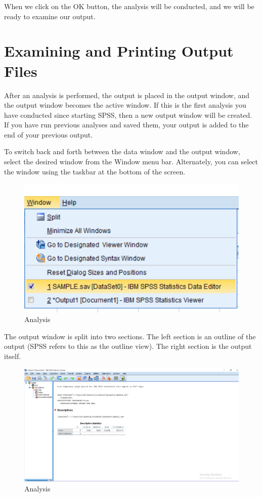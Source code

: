 \documentclass[
]{book}
\begin{document}
When we click on the OK button, the analysis will be conducted, and we will be ready to examine our output.

\hypertarget{examining-and-printing-output-files}{%
\section{Examining and Printing Output Files}\label{examining-and-printing-output-files}}

After an analysis is performed, the output is placed in the output window, and the output window becomes the active window. If this is the first analysis you have conducted since starting SPSS, then a new output window will be created. If you have run previous analyses and saved them, your output is added to the end of your previous output.

To switch back and forth between the data window and the output window, select the desired window from the Window menu bar. Alternately, you can select the window using the taskbar at the bottom of the screen.

\begin{figure}
\centering
\includegraphics{WindowsChange.png}
\caption{Analysis}
\end{figure}

The output window is split into two sections. The left section is an outline of the output (SPSS refers to this as the outline view). The right section is the output itself.

\begin{figure}
\centering
\includegraphics{output2.png}
\caption{Analysis}
\end{figure}
\end{document}
